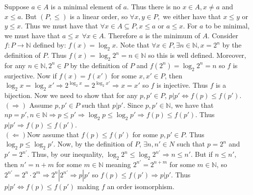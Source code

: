 \documentclass[12pt, a4paper]{exam}
\begin{document}
\begin{questions}
	\pointsdroppedatright
	\question
\vspace{0.2in}
	\pointsdroppedatright
	\question Suppose $a\in A$ is a minimal element of $a$. Thus there is no $x\in A, x\ne a$ and $x\le a$. But $(P, \le) $ is a linear order, so $\forall x,y\in P, $ we either have that $x \le y$ or $y \le x$. Thus we must have that $\forall x \in A \subseteq P, x \le a$ or $a \le x$. For $a$ to be minimal, we must have that $a \le x \ \ \forall x\in A$. Therefore $a$ is the minimum of $A$. 
	\question Consider $f:P \to \mathbb{N}$ defined by: $f(x)= \log _2 x$. Note that $\forall x\in P, \exists n\in \mathbb{N}, x=2^n$ by the definition of $P$. Thus $f(x)=\log _2 2^n=n\in \mathbb{N}$ so this is well defined. Moreover, for any $n\in \mathbb{N}, 2^n \in P $ by the definition of $P$ and  $f(2^n)=\log _2 2^n=n$ so $f$ is surjective. Now if $f(x)=f(x')$ for some $x,x' \in P$, then $\log _2 x=\log _2 x' \Rightarrow 2^{\log _2x}=2^{\log _2x'} \Rightarrow x=x'$ so $f$ is injective. Thus $f$ is a bijection. Now we need to show that for any $p,p' \in P$, $p | p' \iff f(p) \le f(p')$. \\ $(\Rightarrow)$ Assume $p,p' \in P$ such that $p|p'$. Since $p,p' \in \mathbb{N}$, we have that $np=p', n \in \mathbb{N} \Rightarrow p \le p' \Rightarrow \log _2p \le \log _2 p' \Rightarrow f(p) \le f(p').$ Thus $p|p' \Rightarrow f(p) \le f(p').$ \\ $(\Leftarrow)$Now assume that $f(p) \le f(p')$ for some $p,p' \in P$. Thus $\log _2 p \le \log _2 p'. $ Now, by the definition of $P$, $\exists n,n' \in N$ such that $p=2^n$ and $p'=2^{n'}$. Thus, by our inequality, $\log _2 2^n \le \log _2 2^{n'} \Rightarrow n\le n'$. But if $n \le n'$, then $n' = n+m$ for some $m \in \mathbb{N}$ meaning $2^{n'}=2^{n+m}$ for some $m\in \mathbb{N}$, so $2^{n'}=2^n \cdot 2^m \Rightarrow 2^n | 2^{n'} \Rightarrow p|p'$ so $f(p) \le f(p') \Rightarrow p|p'.$ Thus $p|p' \iff f(p) \le f(p')$ making $f$ an order isomorphism.
	
	
\end{questions}
\vspace{0.75in}
\end{document}

